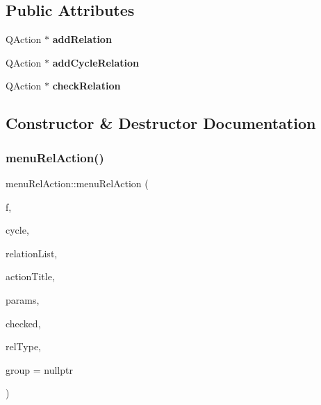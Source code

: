 \subsection*{Public Attributes}
\begin{DoxyCompactItemize}
\item 
\mbox{\label{classmenu_rel_action_ad9c9c61008821fcef78633ed38b42f8c}} 
Q\+Action $\ast$ {\bfseries add\+Relation}
\item 
\mbox{\label{classmenu_rel_action_ab78b5ed63bee30881b70110161670fb5}} 
Q\+Action $\ast$ {\bfseries add\+Cycle\+Relation}
\item 
\mbox{\label{classmenu_rel_action_afa273b825fbdc2d887cc6a3ecfc62265}} 
Q\+Action $\ast$ {\bfseries check\+Relation}
\end{DoxyCompactItemize}


\subsection{Constructor \& Destructor Documentation}
\mbox{\label{classmenu_rel_action_a2db14a6cd576e8cb645a0e1dcf584d4e}} 
\subsubsection{\texorpdfstring{menu\+Rel\+Action()}{menuRelAction()}}
{\footnotesize\ttfamily menu\+Rel\+Action\+::menu\+Rel\+Action (\begin{DoxyParamCaption}\item[{\mbox{\hyperlink{class_moeb_inv_1_1figure}{Moeb\+Inv\+::figure}} $\ast$}]{f,  }\item[{Moeb\+Inv\+::ex}]{cycle,  }\item[{Gi\+Na\+C\+::lst $\ast$}]{relation\+List,  }\item[{Q\+String}]{action\+Title,  }\item[{int}]{params,  }\item[{bool}]{checked,  }\item[{int}]{rel\+Type,  }\item[{\mbox{\hyperlink{classmenu_rel_action_group}{menu\+Rel\+Action\+Group}} $\ast$}]{group = {\ttfamily nullptr} }\end{DoxyParamCaption})}



